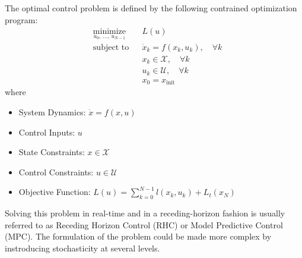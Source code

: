 \documentclass[letterpaper, 10 pt, conference]{ieeeconf}  %
\begin{document}
	The optimal control problem is defined by the following contrained optimization program:
	\begin{equation}
		\begin{aligned}
			& \underset{u_0,\,\ldots,\,u_{N-1}}{\text{minimize}}
			& & L(u) \\
			& \text{subject to}
			& & \dot{x}_k = f(x_k, u_k), \quad \forall k \\
			& & & x_k \in \mathcal{X}, \quad \forall k \\
			& & & u_k \in \mathcal{U}, \quad \forall k \\
			& & & x_0 = x_{\text{init}}
		\end{aligned}
	\end{equation}
	where
	\begin{itemize}
		\item System Dynamics: $\dot{x} = f(x, u)$
		\item Control Inputs: $u$
		\item State Constraints: $x \in \mathcal{X}$
		\item Control Constraints: $u \in \mathcal{U}$
		\item Objective Function: $L(u) = \sum_{k=0}^{N-1} l(x_k, u_k) + L_t(x_N)$
	\end{itemize}
	Solving this problem in real-time and in a receding-horizon fashion is usually referred to as Receding Horizon Control (RHC) or Model Predictive Control (MPC). The formulation of the problem could be made more complex by instroducing stochasticity at several levels.
\end{document}
